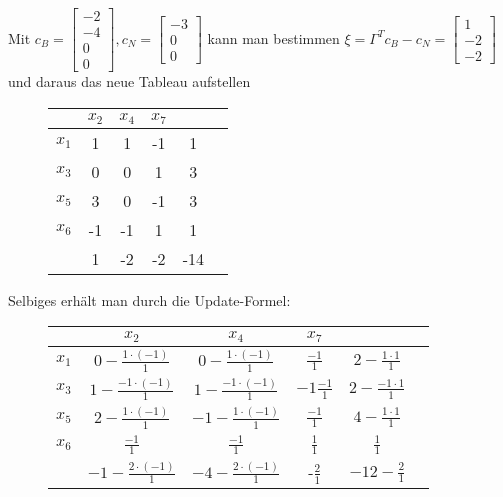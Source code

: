 \documentclass[a4paper, 12pt]{report}
\begin{document}
Mit $c_B = \begin{bmatrix} -2\\-4\\0\\0 \end{bmatrix}, c_N = \begin{bmatrix} -3\\0\\0 \end{bmatrix} $ kann man bestimmen
$\xi = \Gamma^Tc_B - c_N = \begin{bmatrix} 1\\-2\\-2 \end{bmatrix}$ und daraus das neue Tableau aufstellen

\begin{figure}[H]
  \centering
  \def\arraystretch{1.25}
  \begin{tabular}{l|c c c|c|c}
    & $x_2$ & $x_4$ & $x_7$ & &\\
    \hline
    $x_1$ & 1 & 1 & -1 & 1 & \\
    $x_3$ & 0 & 0 & 1 & 3 & \\
    $x_5$ & 3 & 0 & -1 & 3 & \\
    $x_6$ & -1 & -1 & 1 & 1 & \\
    \hline
    & 1 & -2 & -2 & -14 &
  \end{tabular}
\end{figure}

Selbiges erhält man durch die Update-Formel:

\begin{figure}[H]
  \centering
  \def\arraystretch{1.25}
  \begin{tabular}{l|c c c|c|c}
    & $x_2$ & $x_4$ & $x_7$ & &\\
    \hline
    $x_1$ & $0 - \frac{1\cdot(-1)}{1}$ & $0 - \frac{1\cdot(-1)}{1}$ & $\frac{-1}{1}$ & $2 - \frac{1\cdot 1}{1}$ & \\
    $x_3$ & $1-\frac{-1\cdot(-1)}{1}$ & $1 - \frac{-1\cdot(-1)}{1}$ & $-1\frac{-1}{1}$ & $2-\frac{-1\cdot 1}{1}$ & \\
    $x_5$ & $2 - \frac{1\cdot (-1)}{1}$ & $-1 - \frac{1\cdot(-1)}{1}$ & $\frac{-1}{1}$ & $4 - \frac{1\cdot 1}{1}$ & \\
    $x_6$ & $\frac{-1}{1}$ & $\frac{-1}{1}$ & $\frac{1}{1}$ & $\frac{1}{1}$ & \\
    \hline
    & $-1-\frac{2\cdot(-1)}{1}$ & $-4-\frac{2\cdot(-1)}{1}$ & -$\frac{2}{1}$ & $-12-\frac{2}{1}$ &
  \end{tabular}
\end{figure}
\end{document}
